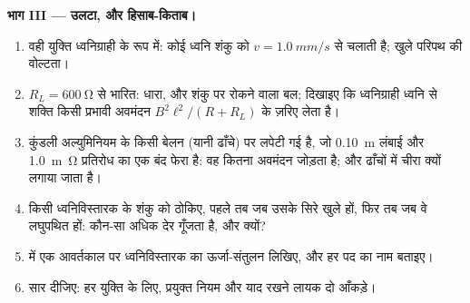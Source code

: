 \begin{problem}
\medskip
\noindent\textbf{भाग III --- उलटा, और हिसाब-किताब।}
\begin{enumerate}[resume]
  \item वही युक्ति ध्वनिग्राही के रूप में: कोई ध्वनि शंकु को
        $v = \qty{1.0}{mm/s}$ से चलाती है; खुले परिपथ की वोल्टता।
  \item $R_L = \qty{600}{\ohm}$ से भारित: धारा, और शंकु पर रोकने वाला बल;
        दिखाइए कि ध्वनिग्राही ध्वनि से शक्ति किसी प्रभावी अवमंदन
        $B^2\ell^2/(R + R_L)$ के ज़रिए लेता है।
  \item कुंडली अल्युमिनियम के किसी बेलन (यानी ढाँचे) पर लपेटी गई है, जो
        \qty{0.10}{m} लंबाई और \qty{1.0}{m\ohm} प्रतिरोध का एक बंद फेरा है:
        वह कितना अवमंदन जोड़ता है; और ढाँचों में चीरा क्यों लगाया जाता है।
  \item किसी ध्वनिविस्तारक के शंकु को ठोकिए, पहले तब जब उसके सिरे खुले
        हों, फिर तब जब वे लघुपथित हों: कौन-सा अधिक देर गूँजता है, और
        क्यों?
  \item {} में एक आवर्तकाल पर ध्वनिविस्तारक का ऊर्जा-संतुलन
        लिखिए, और हर पद का नाम बताइए।
  \item सार दीजिए: हर युक्ति के लिए, प्रयुक्त नियम और याद रखने लायक दो
        आँकड़े।
\end{enumerate}
\end{problem}

